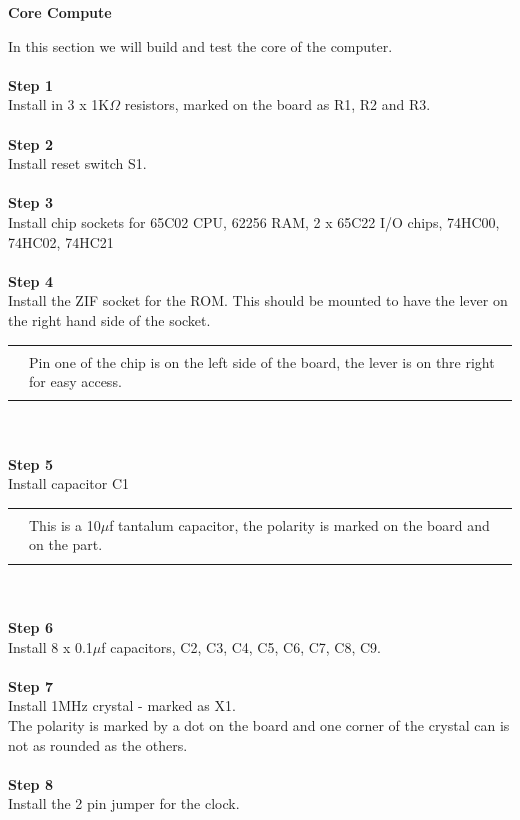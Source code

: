 \documentclass{ol-softwaremanual}
\newcommand{\Note}[1]{
\begin{table}[h]
\begin{tabular}{|p{0.1\textwidth}p{0.8\textwidth}|}
\hline
 & \\
\multicolumn{1}{|r}{\Huge\warning} & #1\\
 &  \\ \hline
\end{tabular}
\end{table}
}
\begin{document}
\begin{ffcode}
\pagebreak
\begin{center}
\textbf{Core Compute}
\end{center}
In this section we will build and test the core of the computer.\\
\\
\textbf{Step 1}\\
Install in 3 x 1K$\Omega$ resistors, marked on the board as R1, R2 and R3.\\
\\
\textbf{Step 2}\\
Install reset switch S1.\\
\\
\textbf{Step 3}\\
Install chip sockets for 65C02 CPU, 62256 RAM, 2 x 65C22 I/O chips, 74HC00, 74HC02, 74HC21\\
\\
\textbf{Step 4}\\
Install the ZIF socket for the ROM. This should be mounted to have the lever on the right hand side of the socket.\\
\Note{Pin one of the chip is on the left side of the board, the lever is on thre right for easy access.}\\
\\
\textbf{Step 5}\\
Install capacitor C1
\Note{This is a 10$\mu$f tantalum capacitor, the polarity is marked on the board and on the part.}\\
\\
\textbf{Step 6}\\
Install 8 x 0.1$\mu$f capacitors, C2, C3, C4, C5, C6, C7, C8, C9.\\
\\
\textbf{Step 7}\\
Install 1MHz crystal - marked as X1.\\
The polarity is marked by a dot on the board and one corner of the crystal can is not as rounded as the others.\\
\\
\textbf{Step 8}\\
Install the 2 pin jumper for the clock.\\
\\
\pagebreak


\end{ffcode}
\end{document}
